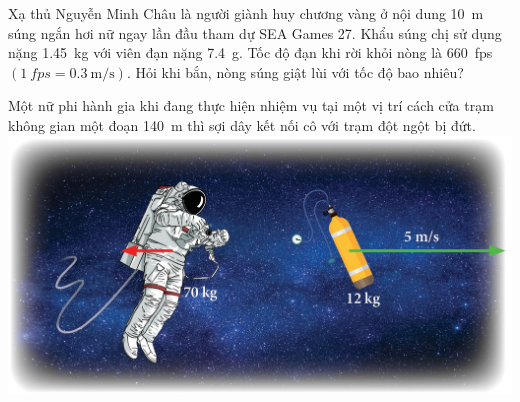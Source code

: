 \begin{vd}
Xạ thủ Nguyễn Minh Châu là người giành huy chương vàng ở nội dung \SI{10}{\meter} súng ngắn hơi nữ ngay lần đầu tham dự SEA Games 27. Khẩu súng chị sử dụng nặng \SI{1.45}{\kilogram} với viên đạn nặng \SI{7.4}{\gram}. Tốc độ đạn khi rời khỏi nòng là \SI{660}{fps} $\left(\SI{1}{fps}=\SI{0.3}{\meter/\second}\right)$. Hỏi khi bắn, nòng súng giật lùi với tốc độ bao nhiêu?
\end{vd}
\begin{vd}Một nữ phi hành gia khi đang thực hiện nhiệm vụ tại một vị trí cách cửa trạm không gian một đoạn \SI{140}{\meter} thì sợi dây kết nối cô với trạm đột ngột bị đứt. 
	{\includegraphics[scale=0.4]{figs/DONGLUONG-4}}
\end{vd}
